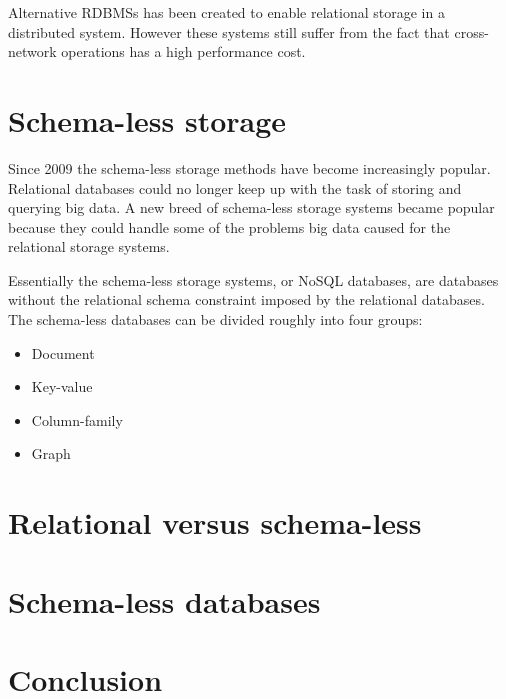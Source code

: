 Alternative RDBMSs has been created to enable relational storage in a distributed system\cite{Cattell:ScalableSQLAndNoSQLDataStores}.
However these systems still suffer from the fact that cross-network operations has a high performance cost.

\section{Schema-less storage}
Since 2009 the schema-less storage methods have become increasingly popular.
Relational databases could no longer keep up with the task of storing and querying big data.
A new breed of schema-less storage systems became popular because they could handle some of the problems big data caused for the relational storage systems.

Essentially the schema-less storage systems, or NoSQL databases, are databases without the relational schema constraint imposed by the relational databases. The schema-less databases can be divided roughly into four groups\cite{Fowler:IntroNoSQL}:

\begin{itemize}
\item Document
\item Key-value
\item Column-family
\item Graph
\end{itemize}



\section{Relational versus schema-less}

\section{Schema-less databases}

\section{Conclusion}